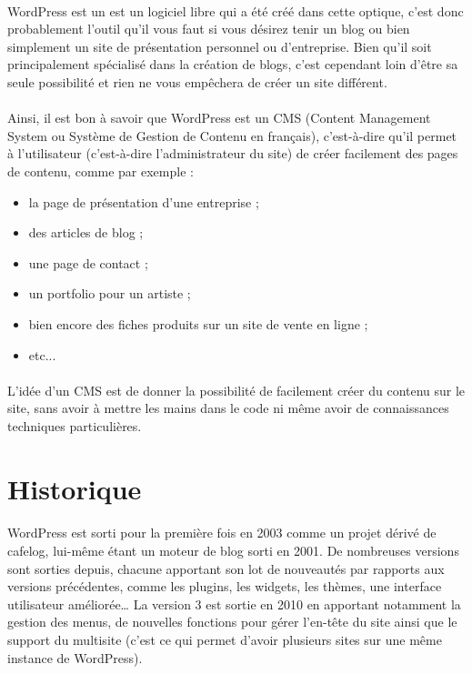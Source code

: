 \documentclass[10pt,a4paper]{article}
\begin{document}
\paragraph{}WordPress est un est un logiciel libre qui a été créé dans cette optique, c'est donc probablement l'outil qu'il vous faut si vous désirez tenir un blog ou bien simplement un site de présentation personnel ou d'entreprise. Bien qu'il soit principalement spécialisé dans la création de blogs, c’est cependant loin d’être sa seule possibilité et rien ne vous empêchera de créer un site différent.
\paragraph{}Ainsi, il est bon à savoir que WordPress est un CMS (Content Management System ou Système de Gestion de Contenu en français), c’est-à-dire qu’il permet à l’utilisateur (c'est-à-dire l’administrateur du site) de créer facilement des pages de contenu, comme par exemple :
\begin{itemize}
\item la page de présentation d’une entreprise ;
\item des articles de blog ;
\item une page de contact ;
\item un portfolio pour un artiste ;
\item bien encore des fiches produits sur un site de vente en ligne ;
\item etc...
\end{itemize}
\paragraph{}L’idée d’un CMS est de donner la possibilité de facilement créer du contenu sur le site, sans avoir à mettre les mains dans le code ni même avoir de connaissances techniques particulières.
\section{Historique}
\paragraph{}WordPress est sorti pour la première fois en 2003 comme un projet dérivé de cafelog, lui-même étant un moteur de blog sorti en 2001. De nombreuses versions sont sorties depuis, chacune apportant son lot de nouveautés par rapports aux versions précédentes, comme les plugins, les widgets, les thèmes, une interface utilisateur améliorée… La version 3 est sortie en 2010 en apportant notamment la gestion des menus, de nouvelles fonctions pour gérer l’en-tête du site ainsi que le support du multisite (c’est ce qui permet d’avoir plusieurs sites sur une même instance de WordPress).
\end{document}
